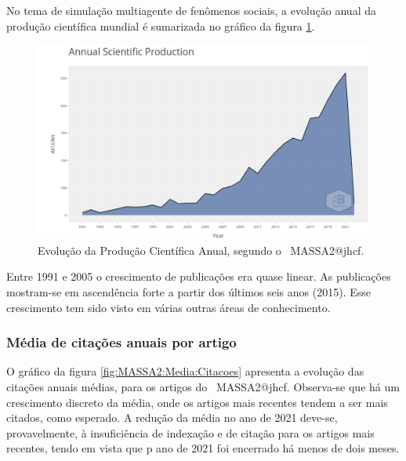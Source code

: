 No tema de simulação multiagente de fenômenos sociais, a evolução anual da produção científica mundial é sumarizada no gráfico da figura \ref{fig:MASSA2:Annual-Scientific-Production}.

\begin{figure}
    \centering
    \includegraphics[width=1\textwidth]{exploratory-data-analysis/jhcf/PesqBibliogr/SimulacaoMultiagente/WoS-20220203/Descritiva/MASSA2-Annual-Scientific-Production.png}
    \caption{Evolução da Produção Científica Anual, segundo o \dataset\ MASSA2@jhcf.}
    \label{fig:MASSA2:Annual-Scientific-Production}
\end{figure}

Entre 1991 e 2005 o crescimento de publicações era quase linear. As publicações mostram-se em ascendência forte a partir dos últimos seis anos (2015). Esse crescimento tem sido visto em várias outras áreas de conhecimento.

\subsubsection{Média de citações anuais por artigo}

O gráfico da figura \ref{fig:MASSA2:Media:Citacoes} apresenta a evolução das citações anuais médias, para os artigos do \dataset\ MASSA2@jhcf. Observa-se que há um crescimento discreto da média, onde os artigos mais recentes tendem a ser mais citados, como esperado. A redução da média no ano de 2021 deve-se, provavelmente, à insuficiência de indexação e de citação para os artigos mais recentes, tendo em vista que p ano de 2021 foi encerrado há menos de dois meses. 

